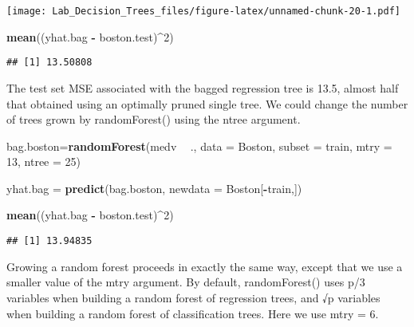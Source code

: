 \documentclass[]{article}
\newenvironment{Shaded}{\begin{snugshade}}{\end{snugshade}}
\newcommand{\KeywordTok}[1]{\textcolor[rgb]{0.13,0.29,0.53}{\textbf{#1}}}
\newcommand{\DataTypeTok}[1]{\textcolor[rgb]{0.13,0.29,0.53}{#1}}
\newcommand{\DecValTok}[1]{\textcolor[rgb]{0.00,0.00,0.81}{#1}}
\newcommand{\StringTok}[1]{\textcolor[rgb]{0.31,0.60,0.02}{#1}}
\newcommand{\OperatorTok}[1]{\textcolor[rgb]{0.81,0.36,0.00}{\textbf{#1}}}
\newcommand{\NormalTok}[1]{#1}
\begin{document}
\texttt{[image: Lab\_Decision\_Trees\_files/figure-latex/unnamed-chunk-20-1.pdf]}

\begin{Shaded}
\begin{Highlighting}[]
\KeywordTok{mean}\NormalTok{((yhat.bag }\OperatorTok{-}\StringTok{ }\NormalTok{boston.test)}\OperatorTok{^}\DecValTok{2}\NormalTok{)}
\end{Highlighting}
\end{Shaded}

\begin{verbatim}
## [1] 13.50808
\end{verbatim}

The test set MSE associated with the bagged regression tree is 13.5,
almost half that obtained using an optimally pruned single tree. We
could change the number of trees grown by randomForest() using the ntree
argument.

\begin{Shaded}
\begin{Highlighting}[]
\NormalTok{bag.boston=}\KeywordTok{randomForest}\NormalTok{(medv }\OperatorTok{~}\StringTok{ }\NormalTok{., }\DataTypeTok{data =}\NormalTok{ Boston, }\DataTypeTok{subset =}\NormalTok{ train, }
                        \DataTypeTok{mtry =} \DecValTok{13}\NormalTok{, }
                        \DataTypeTok{ntree =} \DecValTok{25}\NormalTok{)}

\NormalTok{yhat.bag =}\StringTok{ }\KeywordTok{predict}\NormalTok{(bag.boston, }\DataTypeTok{newdata =}\NormalTok{ Boston[}\OperatorTok{-}\NormalTok{train,])}

\KeywordTok{mean}\NormalTok{((yhat.bag }\OperatorTok{-}\StringTok{ }\NormalTok{boston.test)}\OperatorTok{^}\DecValTok{2}\NormalTok{) }
\end{Highlighting}
\end{Shaded}

\begin{verbatim}
## [1] 13.94835
\end{verbatim}

Growing a random forest proceeds in exactly the same way, except that we
use a smaller value of the mtry argument. By default, randomForest()
uses p/3 variables when building a random forest of regression trees,
and √p variables when building a random forest of classification trees.
Here we use mtry = 6.
\end{document}
